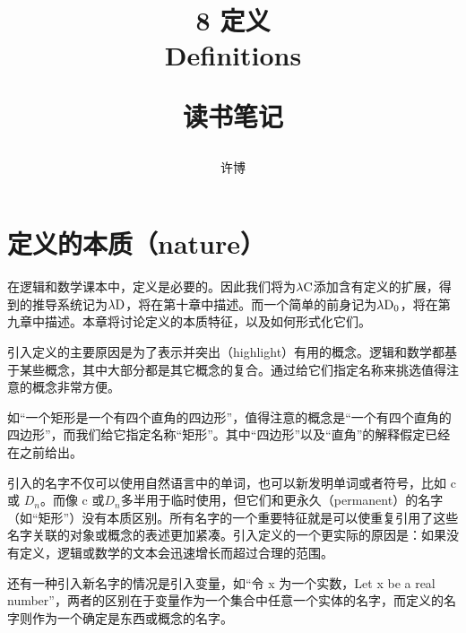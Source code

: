 \documentclass[UTF8]{article}
\title{8 定义\\Definitions\\[2ex]\begin{large}读书笔记\end{large}}
\author{许博}
\date{}
\begin{document}
\maketitle
	\section{定义的本质（nature）}
	\noindent
	在逻辑和数学课本中，定义是必要的。因此我们将为$\lambda{\rm C}$添加含有定义的扩展，得到的推导系统记为$\lambda{\rm D}$，将在第十章中描述。而一个简单的前身记为$\lambda{\rm D_0}$，将在第九章中描述。本章将讨论定义的本质特征，以及如何形式化它们。
	
		引入定义的主要原因是为了表示并突出（highlight）有用的概念。逻辑和数学都基于某些概念，其中大部分都是其它概念的复合。通过给它们指定名称来挑选值得注意的概念非常方便。
		
		如“一个矩形是一个有四个直角的四边形”，值得注意的概念是“一个有四个直角的四边形”，而我们给它指定名称“矩形”。其中“四边形”以及“直角”的解释假定已经在之前给出。
		
		引入的名字不仅可以使用自然语言中的单词，也可以新发明单词或者符号，比如 c 或 $D_n$。而像 c 或$D_n$多半用于临时使用，但它们和更永久（permanent）的名字（如“矩形”）没有本质区别。所有名字的一个重要特征就是可以使重复引用了这些名字关联的对象或概念的表述更加紧凑。引入定义的一个更实际的原因是：如果没有定义，逻辑或数学的文本会迅速增长而超过合理的范围。
		
		还有一种引入新名字的情况是引入变量，如“令 x 为一个实数，Let x be a real number”，两者的区别在于变量作为一个集合中任意一个实体的名字，而定义的名字则作为一个确定是东西或概念的名字。
\end{document}
